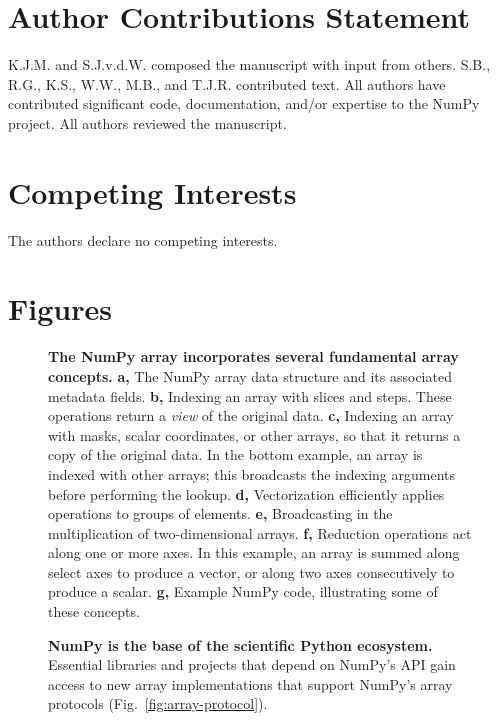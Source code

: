 \documentclass[twocolumn]{article}
\begin{document}
\section*{Author Contributions Statement}

K.J.M. and S.J.v.d.W. composed the manuscript with input from others.
S.B., R.G., K.S., W.W., M.B., and T.J.R. contributed text.
All authors have contributed significant code, documentation, and/or expertise
to the NumPy project.
All authors reviewed the manuscript.

\section*{Competing Interests}

The authors declare no competing interests.

\section*{Figures}

\begin{figure*}[h]
  \centering

  \caption{\textbf{The NumPy array incorporates several fundamental array concepts.}
    \textbf{a,} The NumPy array data structure and its associated metadata fields.
    \textbf{b,} Indexing an array with slices and steps. These
  operations return a \emph{view} of the original data.
    \textbf{c,} Indexing an array with masks, scalar coordinates, or
  other arrays, so that it returns a copy of the original data. In the
  bottom example, an array is indexed with other arrays; this broadcasts the indexing arguments before performing the lookup.
    \textbf{d,} Vectorization efficiently applies operations to groups
  of elements.
    \textbf{e,} Broadcasting in the multiplication of two-dimensional arrays.
    \textbf{f,} Reduction operations act along one or more axes. In this
    example, an array is summed along select axes to produce a vector, or along two axes consecutively to
    produce a scalar.
    \textbf{g,} Example NumPy code, illustrating some of these concepts.
   }
  \label{fig:array-concepts}
\end{figure*}

\begin{figure}
  \centering

  \caption{\textbf{NumPy is the base of the scientific Python ecosystem.}
   Essential libraries and projects that depend on NumPy's API gain access to new array
   implementations that support NumPy's array protocols (Fig.~\ref{fig:array-protocol}).
  }
  \label{fig:ecosystem}
\end{figure}
\end{document}
